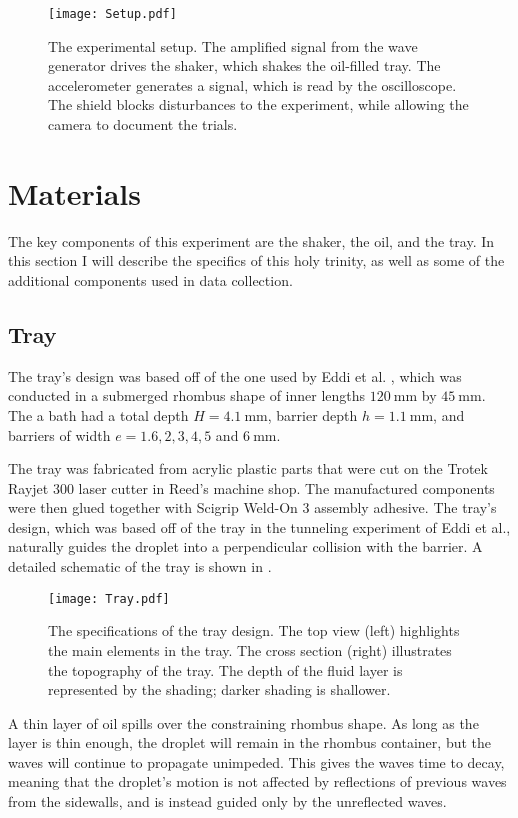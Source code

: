    
    
\begin{figure}[h!]
	\centering
	\texttt{[image: Setup.pdf]}
	\caption{The experimental setup. The amplified signal from the wave generator drives the shaker, which shakes the oil-filled tray. The accelerometer generates a signal, which is read by the oscilloscope. The shield blocks disturbances to the experiment, while allowing the camera to document the trials.}
	\label{setup}
\end{figure}

\section{Materials}
The key components of this experiment are the shaker, the oil, and the tray. In this section I will describe the specifics of this holy trinity, as well as some of the additional components used in data collection. 

\subsection{Tray}
The tray's design was based off of the one used by Eddi et al. , which was conducted in a submerged rhombus shape of inner lengths $120~\mathrm{mm}$ by $45~\mathrm{mm}$. The a bath had a total depth $H = 4.1~\mathrm{mm}$, barrier depth $h = 1.1~\mathrm{mm}$, and barriers of width $e = 1.6, 2, 3, 4, 5 $ and $ 6~\mathrm{mm}$.

The tray was fabricated from acrylic plastic parts that were cut on the Trotek Rayjet 300 laser cutter in Reed's machine shop. The manufactured components were then glued together with Scigrip Weld-On 3 assembly adhesive. The tray's design, which was based off of the tray in the tunneling experiment of Eddi et al., naturally guides the droplet into a perpendicular collision with the barrier. A detailed schematic of the tray is shown in . 

\begin{figure}[h!]
	\centering
	\texttt{[image: Tray.pdf]}
	\caption{The specifications of the tray design. The top view (left) highlights the main elements in the tray. The cross section (right) illustrates the topography of the tray. The depth of the fluid layer is represented by the shading; darker shading is shallower.}
	\label{tray}
\end{figure}

A thin layer of oil spills over the constraining rhombus shape. As long as the layer is thin enough, the droplet will remain in the rhombus container, but the waves will continue to propagate unimpeded. This gives the waves time to decay, meaning that the droplet's motion is not affected by reflections of previous waves from the sidewalls, and is instead guided only by the unreflected waves. 

